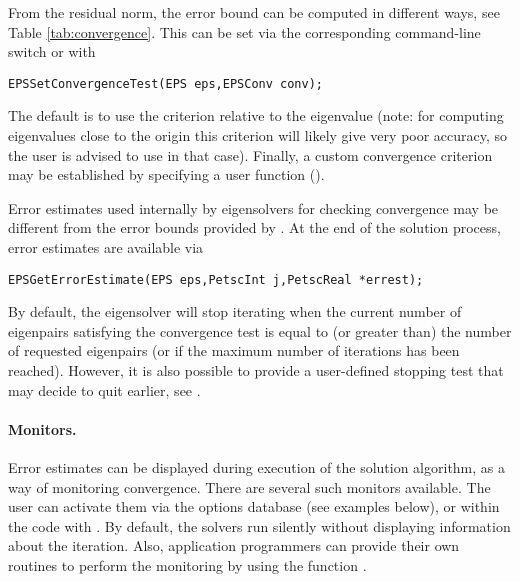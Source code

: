 From the residual norm, the error bound can be computed in different ways, see Table \ref{tab:convergence}. This can be set via the corresponding command-line switch or with
        \begin{Verbatim}[fontsize=\small]
        EPSSetConvergenceTest(EPS eps,EPSConv conv);
        \end{Verbatim}
The default is to use the criterion relative to the eigenvalue (note: for computing eigenvalues close to the origin this criterion will likely give very poor accuracy, so the user is advised to use  in that case). Finally, a custom convergence criterion may be established by specifying a user function ().

Error estimates used internally by eigensolvers for checking convergence may be different from the error bounds provided by . At the end of the solution process, error estimates are available via
        \begin{Verbatim}[fontsize=\small]
        EPSGetErrorEstimate(EPS eps,PetscInt j,PetscReal *errest);
        \end{Verbatim}

By default, the eigensolver will stop iterating when the current number of eigenpairs satisfying the convergence test is equal to (or greater than) the number of requested eigenpairs (or if the maximum number of iterations has been reached). However, it is also possible to provide a user-defined stopping test that may decide to quit earlier, see .

\paragraph{Monitors.}

Error estimates can be displayed during execution of the solution algorithm, as a way of monitoring convergence. There are several such monitors available. The user can activate them via the options database (see examples below), or within the code with . By default, the solvers run silently without displaying information about the iteration. Also, application programmers can provide their own routines to perform the monitoring by using the function .

